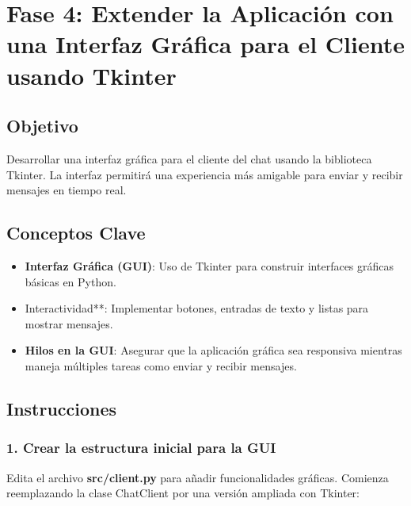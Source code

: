 \documentclass[
  a4paper,
  DIV=11,
  numbers=noendperiod,
  onepage,
  openany]{scrreprt}
\providecommand{\tightlist}{%
  \setlength{\itemsep}{0pt}\setlength{\parskip}{0pt}}\usepackage{longtable,booktabs,array}
\begin{document}
\chapter{Fase 4: Extender la Aplicación con una Interfaz Gráfica para el
Cliente usando
Tkinter}\label{fase-4-extender-la-aplicaciuxf3n-con-una-interfaz-gruxe1fica-para-el-cliente-usando-tkinter}

\section{Objetivo}\label{objetivo-4}

Desarrollar una interfaz gráfica para el cliente del chat usando la
biblioteca Tkinter. La interfaz permitirá una experiencia más amigable
para enviar y recibir mensajes en tiempo real.

\section{Conceptos Clave}\label{conceptos-clave-18}

\begin{itemize}
\tightlist
\item
  \textbf{Interfaz Gráfica (GUI)}: Uso de Tkinter para construir
  interfaces gráficas básicas en Python.
\item
  Interactividad**: Implementar botones, entradas de texto y listas para
  mostrar mensajes.
\item
  \textbf{Hilos en la GUI}: Asegurar que la aplicación gráfica sea
  responsiva mientras maneja múltiples tareas como enviar y recibir
  mensajes.
\end{itemize}

\section{Instrucciones}\label{instrucciones-14}

\subsection{1. Crear la estructura inicial para la
GUI}\label{crear-la-estructura-inicial-para-la-gui}

Edita el archivo \textbf{src/client.py} para añadir funcionalidades
gráficas. Comienza reemplazando la clase ChatClient por una versión
ampliada con Tkinter:
\end{document}
